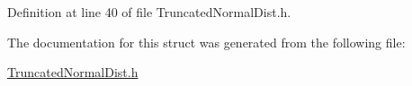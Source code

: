 Definition at line 40 of file Truncated\+Normal\+Dist.\+h.



The documentation for this struct was generated from the following file\+:\begin{DoxyCompactItemize}
\item 
\hyperlink{TruncatedNormalDist_8h}{Truncated\+Normal\+Dist.\+h}\end{DoxyCompactItemize}
